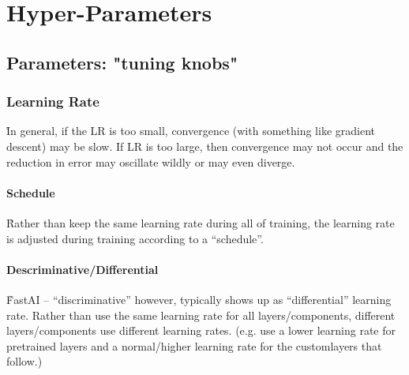 \section{Hyper-Parameters}



\subsection{Parameters: "tuning knobs"}

\subsubsection{Learning Rate}
\label{hp_learning_rate}






\r{In general, if the LR is too small, convergence (with something like gradient descent) may be slow.  If LR is too large, then convergence may not occur and the reduction in error may oscillate wildly or may even diverge.}


\paragraph{Schedule}

\r{Rather than keep the same learning rate during all of training, the learning rate is adjusted during training according to a ``schedule''.}

\paragraph{Descriminative/Differential}

\r{FastAI -- ``discriminative'' however, typically shows up as ``differential'' learning rate. Rather than use the same learning rate for all layers/components, different layers/components use different learning rates. (e.g. use a lower learning rate for pretrained layers and a normal/higher learning rate for the customlayers that follow.)}

